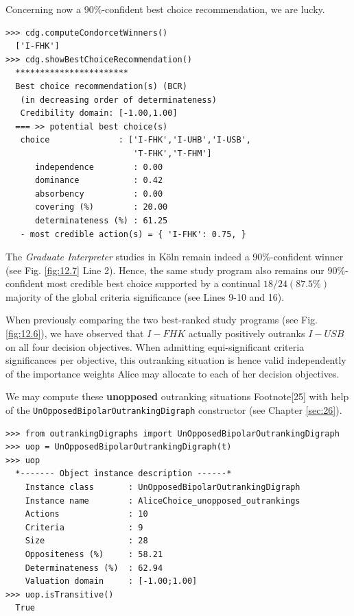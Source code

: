 Concerning now a 90\%-confident best choice recommendation, we are lucky. 

\begin{lstlisting}[caption={Computing the 90\% confident best choice recommendation},label=list:12.7]
>>> cdg.computeCondorcetWinners()
  ['I-FHK']
>>> cdg.showBestChoiceRecommendation()
  ***********************
  Best choice recommendation(s) (BCR)
   (in decreasing order of determinateness)   
   Credibility domain: [-1.00,1.00]
  === >> potential best choice(s)
   choice              : ['I-FHK','I-UHB','I-USB',
                          'T-FHK','T-FHM']
      independence        : 0.00
      dominance           : 0.42
      absorbency          : 0.00
      covering (%)        : 20.00
      determinateness (%) : 61.25
   - most credible action(s) = { 'I-FHK': 0.75, }
\end{lstlisting}
 
The \emph{Graduate Interpreter} studies in Köln remain indeed a 90\%-confident \Condorcet winner (see Fig. \ref{fig:12.7} Line 2). Hence, the same study program also remains our 90\%-confident most credible best choice supported by a continual $18/24 (87.5\%)$ majority of the global criteria significance (see Lines 9-10 and 16).

When previously comparing the two best-ranked study programs (see Fig. \ref{fig:12.6}), we have observed that $I-FHK$ actually positively outranks $I-USB$ on all four decision objectives. When admitting equi-significant criteria significances per objective, this outranking situation is hence valid independently of the importance weights Alice may allocate to each of her decision objectives. 

We may compute these \textbf{unopposed} outranking situations Footnote[25] with help of the \texttt{UnOpposedBipolarOutrankingDigraph} constructor (see Chapter \ref{sec:26}).

\begin{lstlisting}[caption={Computing the unopposed outranking situations},label=list:12.8]
>>> from outrankingDigraphs import UnOpposedBipolarOutrankingDigraph
>>> uop = UnOpposedBipolarOutrankingDigraph(t)
>>> uop
  *------- Object instance description ------*
    Instance class       : UnOpposedBipolarOutrankingDigraph
    Instance name        : AliceChoice_unopposed_outrankings
    Actions              : 10
    Criteria             : 9
    Size                 : 28
    Oppositeness (%)     : 58.21
    Determinateness (%)  : 62.94
    Valuation domain     : [-1.00;1.00]
>>> uop.isTransitive()
  True
\end{lstlisting}

